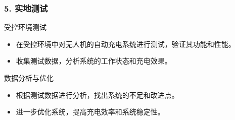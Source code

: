   \begin{frame}
  \frametitle{5. 实地测试}
  
  \begin{block}{受控环境测试}
      \begin{itemize}
          \item 在受控环境中对无人机的自动充电系统进行测试，验证其功能和性能。
          \item 收集测试数据，分析系统的工作状态和充电效果。
      \end{itemize}
  \end{block}
  
  \begin{block}{数据分析与优化}
      \begin{itemize}
          \item 根据测试数据进行分析，找出系统的不足和改进点。
          \item 进一步优化系统，提高充电效率和系统稳定性。
      \end{itemize}
  \end{block}
  
  \end{frame}
